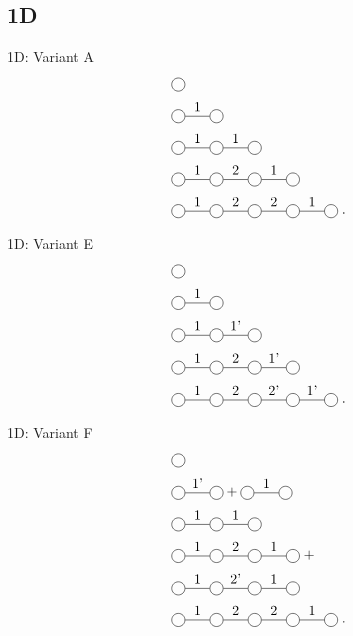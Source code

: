 \subsection{1D}
\begin{frame}{1D: Variant A}
    \begin{subequations}
        \begin{align}
             & \mpob{1}{ {,}  }{}{}{}{{,,}}                                      \\
             & \mpob{2}{ {,"1",}  }{}{}{}{{,,}}                                  \\
             & \mpob{3}{ {,"1","1",}  }{}{}{}{{,,,}}                             \\
             & \mpob{4}{ {,"1","2","1",}  }{}{}{}{{,,,,,}}    \label{2sitepatch} \\
             & \mpob{5}{ {,"1","2","2","1",}  }{}{}{}{{,,,,,}} \; .
        \end{align}
    \end{subequations}
\end{frame}

\begin{frame}{1D: Variant E}
    \begin{subequations}
        \begin{align}
             & \mpob{1}{ {,}  }{}{}{}{{,,}}                          \\
             & \mpob{2}{ {,"1",}  }{}{}{}{{,,}}                      \\
             & \mpob{3}{ {,"1","1'",}  }{}{}{}{{,,,}}                \\
             & \mpob{4}{ {,"1","2","1'",}  }{}{}{}{{,,,,,}}          \\
             & \mpob{5}{ {,"1","2","2'","1'",}  }{}{}{}{{,,,,,}} \;.
        \end{align}
    \end{subequations}
\end{frame}

\begin{frame}{1D: Variant F}
    \begin{subequations}
        \begin{align}
             & \mpob{1}{ {,}  }{}{}{}{{,,}}                                         \\
             & \mpob{2}{ {,"1'",}  }{}{}{}{{,,}}+  \mpob{2}{ {,"1",}  }{}{}{}{{,,}} \\
             & \mpob{3}{ {,"1","1",}  }{}{}{}{{,,,}}                                \\
             & \mpob{4}{ {,"1","2","1",}  }{}{}{}{{,,,,,}} \; +  \nonumber          \\
             & \mpob{4}{ {,"1","2'","1",}  }{}{}{}{{,,,,,}}                         \\
             & \mpob{5}{ {,"1","2","2","1",}  }{}{}{}{{,,,,,}} \;.
        \end{align}
    \end{subequations}
\end{frame}


